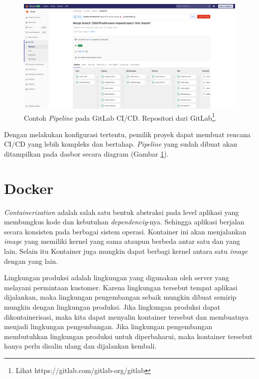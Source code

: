    
    \begin{figure}
        \begin{minipage}{\textwidth}
            \centering
            \includegraphics[width=0.7\paperwidth]{Gambar/gitlab-ci-pipeline.png}
            \caption{Contoh \textit{Pipeline} pada GitLab CI/CD. Repositori dari GitLab\footnote{Lihat https://gitlab.com/gitlab-org/gitlab}.}
            \label{fig:gitlab-ci:pipeline}
        \end{minipage}
    \end{figure}
    
    Dengan melakukan konfigurasi tertentu, pemilik proyek dapat membuat rencana
    CI/CD yang lebih kompleks dan bertahap. \textit{Pipeline} yang sudah dibuat
    akan ditampilkan pada dasbor secara diagram (Gambar
    \ref{fig:gitlab-ci:pipeline}).

\section{Docker}
    \textit{Containerization} adalah salah satu bentuk abstraksi pada level
    aplikasi yang membungkus kode dan kebutuhan \textit{dependenciy}-nya.
    Sehingga aplikasi berjalan secara konsisten pada berbagai sistem
    operasi\cite{docker:what-is-container}. Kontainer ini akan menjalankan
    \textit{image} yang memiliki kernel yang sama ataupun berbeda antar satu dan
    yang lain. Selain itu Kontainer juga mungkin dapat berbagi kernel antara
    satu \textit{image} dengan yang lain.
    
    Lingkungan produksi adalah lingkungan yang digunakan oleh server yang
    melayani permintaan kustomer. Karena lingkungan tersebut tempat aplikasi
    dijalankan, maka lingkungan pengembangan sebaik mungkin dibuat semirip
    mungkin dengan lingkungan produksi. Jika lingkungan produksi dapat
    dikontainerisasi, maka kita dapat menyalin kontainer tersebut dan membuatnya
    menjadi lingkungan pengembangan. Jika lingkungan pengembangan membutuhkan
    lingkungan produksi untuk diperbaharui, maka kontainer tersebut hanya perlu
    disalin ulang dan dijalankan kembali.
    
